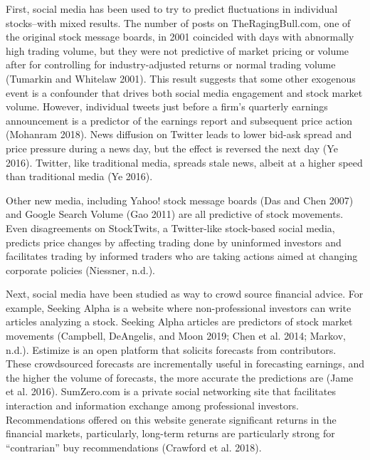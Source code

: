 \documentclass[12pt,]{article}
\begin{document}
First, social media has been used to try to predict fluctuations in
individual stocks--with mixed results. The number of posts on
TheRagingBull.com, one of the original stock message boards, in 2001
coincided with days with abnormally high trading volume, but they were
not predictive of market pricing or volume after for controlling for
industry-adjusted returns or normal trading volume (Tumarkin and
Whitelaw 2001). This result suggests that some other exogenous event is
a confounder that drives both social media engagement and stock market
volume. However, individual tweets just before a firm's quarterly
earnings announcement is a predictor of the earnings report and
subsequent price action (Mohanram 2018). News diffusion on Twitter leads
to lower bid-ask spread and price pressure during a news day, but the
effect is reversed the next day (Ye 2016). Twitter, like traditional
media, spreads stale news, albeit at a higher speed than traditional
media (Ye 2016).

Other new media, including Yahoo! stock message boards (Das and Chen
2007) and Google Search Volume (Gao 2011) are all predictive of stock
movements. Even disagreements on StockTwits, a Twitter-like stock-based
social media, predicts price changes by affecting trading done by
uninformed investors and facilitates trading by informed traders who are
taking actions aimed at changing corporate policies (Niessner, n.d.).

Next, social media have been studied as way to crowd source financial
advice. For example, Seeking Alpha is a website where non-professional
investors can write articles analyzing a stock. Seeking Alpha articles
are predictors of stock market movements (Campbell, DeAngelis, and Moon
2019; Chen et al. 2014; Markov, n.d.). Estimize is an open platform that
solicits forecasts from contributors. These crowdsourced forecasts are
incrementally useful in forecasting earnings, and the higher the volume
of forecasts, the more accurate the predictions are (Jame et al. 2016).
SumZero.com is a private social networking site that facilitates
interaction and information exchange among professional investors.
Recommendations offered on this website generate significant returns in
the financial markets, particularly, long-term returns are particularly
strong for ``contrarian'' buy recommendations (Crawford et al. 2018).
\end{document}
